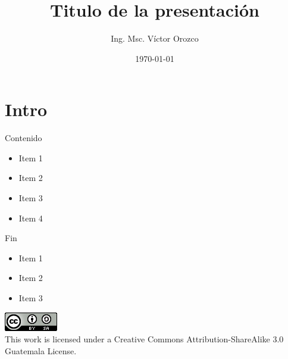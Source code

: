 \documentclass{beamer}
\title{Titulo de la presentación}
\author{Ing. Msc. Víctor Orozco}
\institute{Introducción a la Programación (11001)}
\date{\today}
\begin{document}
\frame{\titlepage}

\section{Intro}

\begin{frame}{Contenido}
    \begin{itemize}
    \item Item 1
    \item Item 2
    \item Item 3
    \item Item 4
    \end{itemize}
\end{frame}

\begin{frame}{Fin}
\begin{itemize}
\item Item 1
\item Item 2
\item Item 3
\end{itemize}
\begin{center}
\includegraphics[width=0.1\linewidth]{Images/cclogo}
\\
This work is licensed under a Creative Commons Attribution-ShareAlike 3.0 Guatemala License.
\end{center}
\end{frame}
\end{document}
